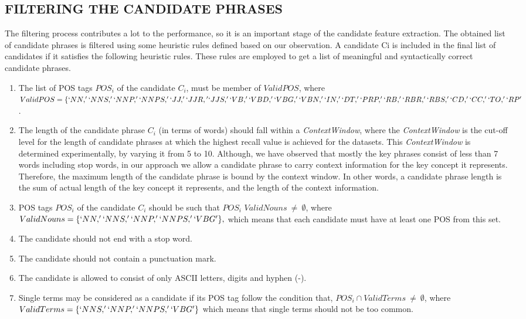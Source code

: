 \documentclass{ieeeaccess}
\begin{document}
\subsection{FILTERING THE CANDIDATE PHRASES}
The filtering process contributes a lot to the performance, so it is an important stage of the candidate feature   extraction. The obtained list of candidate phrases is filtered using some heuristic rules defined based on our  observation. A candidate Ci is included in the final list of candidates if it satisfies the following heuristic rules.  These rules are employed to get a list of meaningful and syntactically correct candidate phrases.

\begin{enumerate}
		\item 
{The list of POS tags $POS_{i}$ of the candidate $C_{i}$, must be member of $ValidPOS$, where 
$ValidPOS = \lbrace `NN,'`NNS,'`NNP,'`NNPS,'`JJ,'`JJR,\\
'`JJS,'`VB,'`VBD,'`VBG,'`VBN,'`IN,'`DT,'\\
`PRP,'`RB,'`RBR,'`RBS,'`CD,'`CC,'\\ `TO,'`RP'$ \rbrace .}

		\item 
{The length of the candidate phrase $C_{i}$ (in terms of words) should fall within a \textit{ContextWindow}, where the \textit{ContextWindow}  is the cut-off level for the length of candidate phrases at which the highest recall value is achieved for the datasets. This \textit{ContextWindow} is determined experimentally, by varying it from 5 to 10. Although, we have observed that mostly the key phrases consist of less than 7 words including stop words, in our approach we allow a candidate phrase to carry context information for the key concept it represents. Therefore, the maximum length of the candidate  phrase is bound by the context window. In other words, a candidate phrase length is the sum of actual length of the key concept it represents, and the length of the context information.}

		\item 
{POS tags $POS_{i}$ of the candidate $C_{i}$ should be such that 
$POS_{i}$ \cap $ ValidNouns~\neq ~\emptyset$, where
$ValidNouns=\lbrace `NN,'`NNS,'`NNP,'`NNPS,'`VBG'\rbrace,$ which means that each candidate must have at least one POS from this set.}

		\item 
{The candidate should not end with a stop word.}

		\item 
{The candidate should not contain a punctuation mark.}

		\item 
{The candidate is allowed to consist of only ASCII letters, digits and hyphen (-).}

		\item 
{Single terms may be considered as a candidate if its POS tag follow the condition that, $POS_{i}\cap ValidTerms~\neq ~\emptyset$, where $ValidTerms=\lbrace`NNS,' `NNP,' `NNPS,'`VBG'\rbrace$
which means that single terms should not be too common.}

\end{enumerate}
\end{document}
